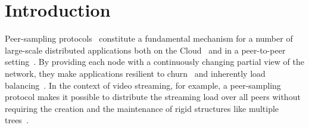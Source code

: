 
\section{Introduction}

Peer-sampling
protocols~\cite{voulgaris2005cyclon,jelasity2007gossip,tolgyeski2009adaptive}
constitute a fundamental mechanism for a number of large-scale
distributed applications both on the Cloud~\cite{decandia2007dynamo}
and in a peer-to-peer
setting~\cite{Frey09Middleware,voulgaris2005sub,wuhib2009robust}. By
providing each node with a continuously changing partial view of the
network, they make applications resilient to churn~\cite{bertier-d2ht}
and inherently load balancing~\cite{Frey09DSN}. In the context of
video streaming, for example, a peer-sampling protocol makes it
possible to distribute the streaming load over all peers without
requiring the creation and the maintenance of rigid structures like
multiple trees~\cite{Frey09DSN, monod:THESIS}.  




